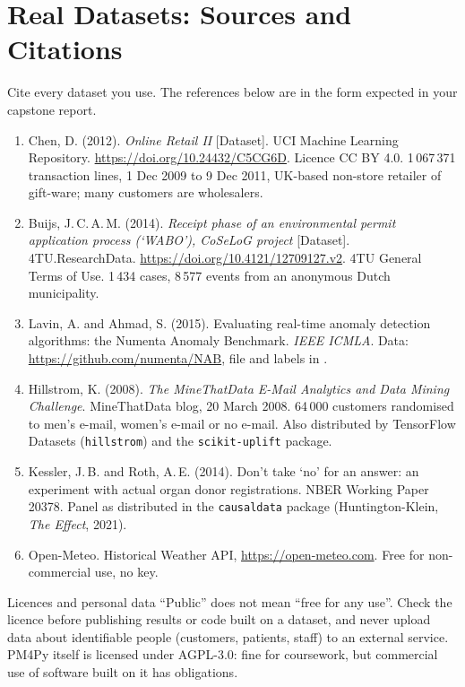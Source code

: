 \chapter{Real Datasets: Sources and Citations}
Cite every dataset you use. The references below are in the form expected in your capstone report.
\begin{enumerate}[leftmargin=1.6em]
\item Chen, D. (2012). \emph{Online Retail II} [Dataset]. UCI Machine Learning Repository.
\url{https://doi.org/10.24432/C5CG6D}. Licence CC BY 4.0. 1\,067\,371 transaction lines, 1 Dec 2009 to 9 Dec 2011,
UK-based non-store retailer of gift-ware; many customers are wholesalers.
\item Buijs, J.\,C.\,A.\,M. (2014). \emph{Receipt phase of an environmental permit application process (`WABO'),
CoSeLoG project} [Dataset]. 4TU.ResearchData. \url{https://doi.org/10.4121/12709127.v2}. 4TU General Terms of Use.
1\,434 cases, 8\,577 events from an anonymous Dutch municipality.
\item Lavin, A. and Ahmad, S. (2015). Evaluating real-time anomaly detection algorithms: the Numenta Anomaly Benchmark.
\emph{IEEE ICMLA}. Data: \url{https://github.com/numenta/NAB}, file
 and labels in .
\item Hillstrom, K. (2008). \emph{The MineThatData E-Mail Analytics and Data Mining Challenge}. MineThatData blog,
20 March 2008. 64\,000 customers randomised to men's e-mail, women's e-mail or no e-mail. Also distributed by
TensorFlow Datasets (\texttt{hillstrom}) and the \texttt{scikit-uplift} package.
\item Kessler, J.\,B. and Roth, A.\,E. (2014). Don't take `no' for an answer: an experiment with actual organ donor
registrations. NBER Working Paper 20378. Panel as distributed in the \texttt{causaldata} package (Huntington-Klein,
\emph{The Effect}, 2021).
\item Open-Meteo. Historical Weather API, \url{https://open-meteo.com}. Free for non-commercial use, no key.
\end{enumerate}

\begin{pitfall}{Licences and personal data}
``Public'' does not mean ``free for any use''. Check the licence before publishing results or code built on a dataset,
and never upload data about identifiable people (customers, patients, staff) to an external service. PM4Py itself is
licensed under AGPL-3.0: fine for coursework, but commercial use of software built on it has obligations.
\end{pitfall}

